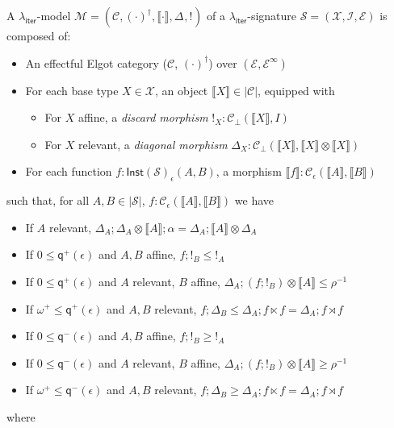 \documentclass[acmsmall,screen,review]{acmart}
\newcommand{\mc}[1]{\ensuremath{\mathcal{#1}}}
\newcommand{\ms}[1]{\ensuremath{\mathsf{#1}}}
\newcommand{\dnt}[1]{\llbracket{#1}\rrbracket}
\newcommand{\tmor}[1]{{!}_{#1}}
\newcommand{\dmor}[1]{{\Delta}_{#1}}
\newcommand{\subiterssa}{\(\lambda_{\ms{iter}}\)}
\newcommand{\zeroq}{0}
\newcommand{\cpyq}{\omega^+}
\newcommand{\alquant}{\ms{q}}
\begin{document}
\begin{definition}[\subiterssa-model]
  A \subiterssa-model $\mc{M} = (\mc{C}, (\cdot)^\dagger, \dnt{\cdot}, \dmor{}, \tmor{})$ of a
  \subiterssa-signature $\mc{S} = (\mc{X}, \mc{I}, \mc{E})$ is composed of:
  \begin{itemize}
    \item An effectful Elgot category ($\mc{C}$, $(\cdot)^\dagger$) over $(\mc{E},
    \mc{E}^\infty)$
    \item For each base type $X \in \mc{X}$, an object $\dnt{X} \in |\mc{C}|$, equipped with
    \begin{itemize}
      \item For $X$ affine, a \emph{discard morphism} $\tmor{X} : \mc{C}_\bot(\dnt{X}, I)$
      \item For $X$ relevant, a \emph{diagonal morphism} $\dmor{X} : \mc{C}_\bot(\dnt{X}, \dnt{X}
      \otimes \dnt{X})$
    \end{itemize}
    \item For each function $f : \ms{Inst}(\mc{S})_\epsilon(A, B)$, a morphism $\dnt{f} :
    \mc{C}_\epsilon(\dnt{A}, \dnt{B})$
  \end{itemize}
  such that, for all $A, B \in |\mc{S}|$, $f : \mc{C}_\epsilon(\dnt{A}, \dnt{B})$ we have
  \begin{itemize}
    \item If $A$ relevant, 
      $\dmor{A} ; \dmor{A} \otimes \dnt{A} ; \alpha = \dmor{A} ; \dnt{A} \otimes \dmor{A}$
    \item If $\zeroq \leq \alquant^+(\epsilon)$ and $A, B$ affine, $f ; !_B \leq !_A$
    \item If $\zeroq \leq \alquant^+(\epsilon)$ and $A$ relevant, $B$ affine, 
      $\dmor{A} ; (f ; !_B) \otimes \dnt{A} \leq \rho^{-1}$
    \item If $\cpyq \leq \alquant^+(\epsilon)$ and $A, B$ relevant, 
    $f ; \dmor{B} \leq \dmor{A} ; f \ltimes f = \dmor{A} ; f \rtimes f$
    \item If $\zeroq \leq \alquant^-(\epsilon)$ and $A, B$ affine, $f ; !_B \geq !_A$
    \item If $\zeroq \leq \alquant^-(\epsilon)$ and $A$ relevant, $B$ affine, 
      $\dmor{A} ; (f ; !_B) \otimes \dnt{A} \geq \rho^{-1}$
    \item If $\cpyq \leq \alquant^-(\epsilon)$ and $A, B$ relevant, 
    $f ; \dmor{B} \geq \dmor{A} ; f \ltimes f = \dmor{A} ; f \rtimes f$
  \end{itemize}
  where
  \begin{itemize}

\end{itemize}
\end{definition}
\end{document}
